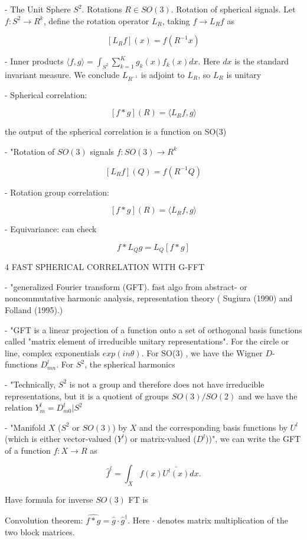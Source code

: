 \documentclass[english]{article}
\begin{document}
- The Unit Sphere $S^2$. Rotations $R\in SO(3)$. Rotation of spherical signals. Let $f:S^2\to R^k$, define the rotation operator $L_R$, taking $f\to L_Rf$ as

$$[L_Rf](x) = f(R^{-1}x)$$ 

- Inner products $\langle f,g \rangle = \int_{S^2} \sum_{k=1}^K g_k(x) f_k(x) dx$. Here $dx$ is the standard invariant measure. We conclude $L_{R^{-1}}$ is adjoint to $L_R$, so $L_R$ is unitary

- Spherical correlation: 

$$[f*g](R)= \langle L_R f,g \rangle$$

 the output of the spherical correlation is a function on SO(3) 

- "Rotation of $SO(3)$ signals $f:SO(3)\to R^k$

$$[L_Rf](Q) = f(R^{-1}Q)$$ 

- Rotation group correlation: 

$$[f*g](R)= \langle L_R f,g \rangle$$

- Equivariance: can check 

$$f*L_Qg = L_Q[f*g]$$

\item 4 FAST SPHERICAL CORRELATION WITH G-FFT

 - "generalized Fourier transform (GFT). fast algo from abstract- or noncommutative harmonic analysis, representation theory ( Sugiura (1990) and Folland (1995).)

 - "GFT is a linear projection of a function onto a set of orthogonal
basis functions called "matrix element of irreducible unitary representations". For the circle or
line, complex exponentials $exp(in\theta)$. For SO(3) , we have the Wigner $D$-functions $D_{mn}^l$. For $S^2$, the spherical harmonics

- "Technically, $S^2$ is not a group and therefore does not have irreducible representations, but it is a quotient of
groups $SO(3)/SO(2)$ and we have the relation $Y^l_m = D^l_{m0}|S^2$

- "Manifold  $X$ ($S^2$ or $SO(3)$) by $X$ and the corresponding basis functions by $U^l$ (which is either vector-valued ($Y^l$) or matrix-valued ($D^l$))", we can write the  GFT of a function
$f : X \to R$ as

$$\hat f^l =\int_X f(x) \bar{U^l(x)}dx.$$

Have formula for inverse $SO(3)$ FT is

Convolution theorem:  $\widehat {f *g} = \hat g \cdot \hat g^{\dagger}$. Here $\cdot$ denotes matrix multiplication of the two block matrices.
\end{document}
